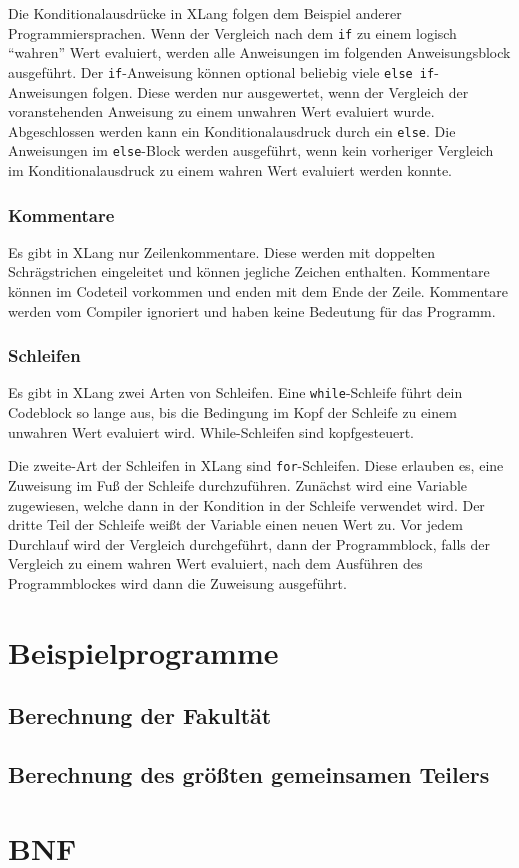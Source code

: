 \documentclass[a4paper]{article}
\begin{document}
Die Konditionalausdrücke in XLang folgen dem Beispiel anderer Programmiersprachen.
Wenn der Vergleich nach dem \texttt{if} zu einem logisch \enquote{wahren} Wert evaluiert, werden
alle Anweisungen im folgenden Anweisungsblock ausgeführt.
Der \texttt{if}-Anweisung können optional beliebig viele \texttt{else if}-Anweisungen folgen.
Diese werden nur ausgewertet, wenn der Vergleich der voranstehenden Anweisung zu einem unwahren Wert
evaluiert wurde.
Abgeschlossen werden kann ein Konditionalausdruck durch ein \texttt{else}. Die Anweisungen im
\texttt{else}-Block werden ausgeführt, wenn kein vorheriger Vergleich im Konditionalausdruck zu
einem wahren Wert evaluiert werden konnte.

\subsubsection{Kommentare}

Es gibt in XLang nur Zeilenkommentare. Diese werden mit doppelten Schrägstrichen eingeleitet und
können jegliche Zeichen enthalten.
Kommentare können im Codeteil vorkommen und enden mit dem Ende der Zeile.
Kommentare werden vom Compiler ignoriert und haben keine Bedeutung für das Programm.

\subsubsection{Schleifen}

Es gibt in XLang zwei Arten von Schleifen. Eine \texttt{while}-Schleife führt dein Codeblock so
lange aus, bis die Bedingung im Kopf der Schleife zu einem unwahren Wert evaluiert wird.
While-Schleifen sind kopfgesteuert.

Die zweite-Art der Schleifen in XLang sind \texttt{for}-Schleifen. Diese erlauben es, eine Zuweisung
im Fuß der Schleife durchzuführen. Zunächst wird eine Variable zugewiesen, welche dann in der
Kondition in der Schleife verwendet wird. Der dritte Teil der Schleife weißt der Variable einen
neuen Wert zu. Vor jedem Durchlauf wird der Vergleich durchgeführt, dann der Programmblock, falls
der Vergleich zu einem wahren Wert evaluiert, nach dem Ausführen des Programmblockes wird dann die
Zuweisung ausgeführt.


\section{Beispielprogramme}

\subsection{Berechnung der Fakultät}



\subsection{Berechnung des größten gemeinsamen Teilers}



\section{BNF}


\end{document}
